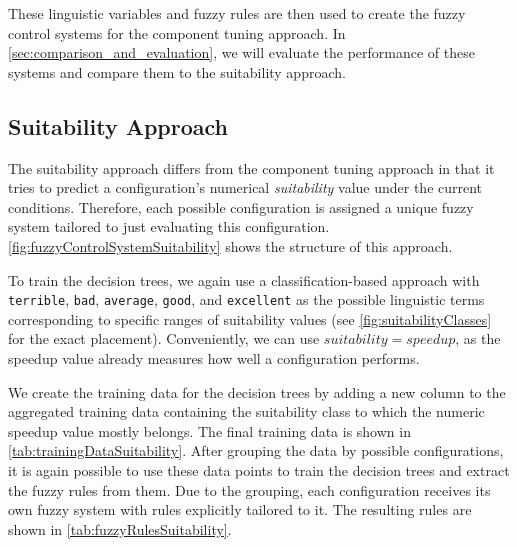 These linguistic variables and fuzzy rules are then used to create the fuzzy control systems for the component tuning approach. In \autoref{sec:comparison_and_evaluation}, we will evaluate the performance of these systems and compare them to the suitability approach.



\subsection{Suitability Approach}

The suitability approach differs from the component tuning approach in that it tries to predict a configuration's numerical \emph{suitability} value under the current conditions. Therefore, each possible configuration is assigned a unique fuzzy system tailored to just evaluating this configuration. \autoref{fig:fuzzyControlSystemSuitability} shows the structure of this approach.

To train the decision trees, we again use a classification-based approach with \texttt{terrible}, \texttt{bad}, \texttt{average}, \texttt{good}, and \texttt{excellent} as the possible linguistic terms corresponding to specific ranges of suitability values (see \autoref{fig:suitabilityClasses} for the exact placement). Conveniently, we can use $suitability=speedup$, as the speedup value already measures how well a configuration performs.

We create the training data for the decision trees by adding a new column to the aggregated training data containing the suitability class to which the numeric speedup value mostly belongs. The final training data is shown in \autoref{tab:trainingDataSuitability}. After grouping the data by possible configurations, it is again possible to use these data points to train the decision trees and extract the fuzzy rules from them. Due to the grouping, each configuration receives its own fuzzy system with rules explicitly tailored to it. The resulting rules are shown in \autoref{tab:fuzzyRulesSuitability}.

